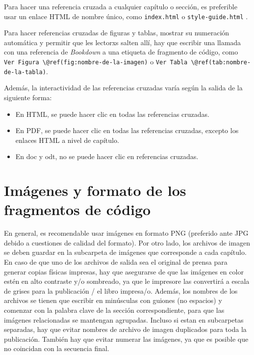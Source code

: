 \documentclass[
]{krantz}
\begin{document}
Para hacer una referencia cruzada a cualquier capítulo o sección, es preferible usar un enlace HTML de nombre único, como \texttt{index.html} o \texttt{style-guide.html} .

Para hacer referencias cruzadas de figuras y tablas, mostrar su numeración automática y permitir que les lectorxs salten allí, hay que escribir una llamada con una referencia de \emph{Bookdown} a una etiqueta de fragmento de código, como \texttt{Ver\ Figura\ \textbackslash{}@ref(fig:nombre-de-la-imagen)} o \texttt{Ver\ Tabla\ \textbackslash{}@ref(tab:nombre-de-la-tabla)}.

Además, la interactividad de las referencias cruzadas varía según la salida de la siguiente forma:

\begin{itemize}
\item
  En HTML, se puede hacer clic en todas las referencias cruzadas.
\item
  En PDF, se puede hacer clic en todas las referencias cruzadas, excepto los enlaces HTML a nivel de capítulo.
\item
  En doc y odt, no se puede hacer clic en referencias cruzadas.
\end{itemize}

\hypertarget{imuxe1genes-y-formato-de-los-fragmentos-de-cuxf3digo}{%
\section{Imágenes y formato de los fragmentos de código}\label{imuxe1genes-y-formato-de-los-fragmentos-de-cuxf3digo}}

En general, es recomendable usar imágenes en formato PNG (preferido ante JPG debido a cuestiones de calidad del formato). Por otro lado, los archivos de imagen se deben guardar en la subcarpeta de imágenes que corresponde a cada capítulo. En caso de que uno de los archivos de salida sea el original de prensa para generar copias físicas impresas, hay que asegurarse de que las imágenes en color estén en alto contraste y/o sombreado, ya que le impresore las convertirá a escala de grises para la publicación / el libro impresa/o. Además, los nombres de los archivos se tienen que escribir en minúsculas con guiones (no espacios) y comenzar con la palabra clave de la sección correspondiente, para que las imágenes relacionadas se mantengan agrupadas. Incluso si estan en subcarpetas separadas, hay que evitar nombres de archivo de imagen duplicados para toda la publicación. También hay que evitar numerar las imágenes, ya que es posible que no coincidan con la secuencia final.
\end{document}
